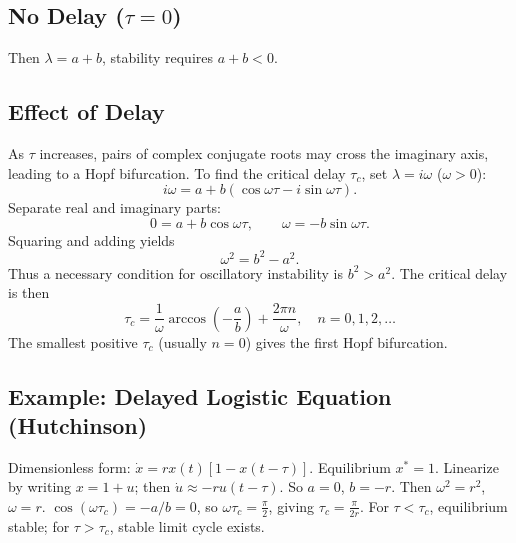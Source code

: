 \documentclass[12pt,a4paper]{book}
\begin{document}
\subsection{No Delay ($\tau=0$)}
Then $\lambda = a + b$, stability requires $a+b < 0$.

\subsection{Effect of Delay}
As $\tau$ increases, pairs of complex conjugate roots may cross the imaginary axis, leading to a Hopf bifurcation. To find the critical delay $\tau_c$, set $\lambda = i\omega$ ($\omega > 0$):
\[
i\omega = a + b (\cos \omega\tau - i \sin \omega\tau).
\]
Separate real and imaginary parts:
\[
0 = a + b \cos \omega\tau, \qquad \omega = -b \sin \omega\tau.
\]
Squaring and adding yields
\[
\omega^2 = b^2 - a^2.
\]
Thus a necessary condition for oscillatory instability is $b^2 > a^2$. The critical delay is then
\[
\tau_c = \frac{1}{\omega} \arccos\!\left(-\frac{a}{b}\right) + \frac{2\pi n}{\omega}, \quad n=0,1,2,\dots
\]
The smallest positive $\tau_c$ (usually $n=0$) gives the first Hopf bifurcation.

\subsection{Example: Delayed Logistic Equation (Hutchinson)}
Dimensionless form: $\dot{x} = r x(t) [1 - x(t-\tau)]$. Equilibrium $x^*=1$. Linearize by writing $x=1+u$; then $\dot{u} \approx -r u(t-\tau)$. So $a=0$, $b=-r$. Then $\omega^2 = r^2$, $\omega = r$. $\cos(\omega\tau_c) = -a/b = 0$, so $\omega\tau_c = \frac{\pi}{2}$, giving $\tau_c = \frac{\pi}{2r}$. For $\tau < \tau_c$, equilibrium stable; for $\tau > \tau_c$, stable limit cycle exists.
\end{document}
